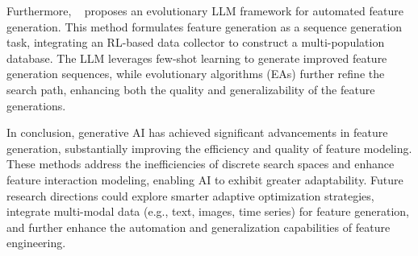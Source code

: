 Furthermore, ~\cite{gong2024evolutionary} proposes an evolutionary LLM framework for automated feature generation. This method formulates feature generation as a sequence generation task, integrating an RL-based data collector to construct a multi-population database. The LLM leverages few-shot learning to generate improved feature generation sequences, while evolutionary algorithms (EAs) further refine the search path, enhancing both the quality and generalizability of the feature generations.

In conclusion, generative AI has achieved significant advancements in feature generation, substantially improving the efficiency and quality of feature modeling. These methods address the inefficiencies of discrete search spaces and enhance feature interaction modeling, enabling AI to exhibit greater adaptability. Future research directions could explore smarter adaptive optimization strategies, integrate multi-modal data (e.g., text, images, time series) for feature generation, and further enhance the automation and generalization capabilities of feature engineering.






